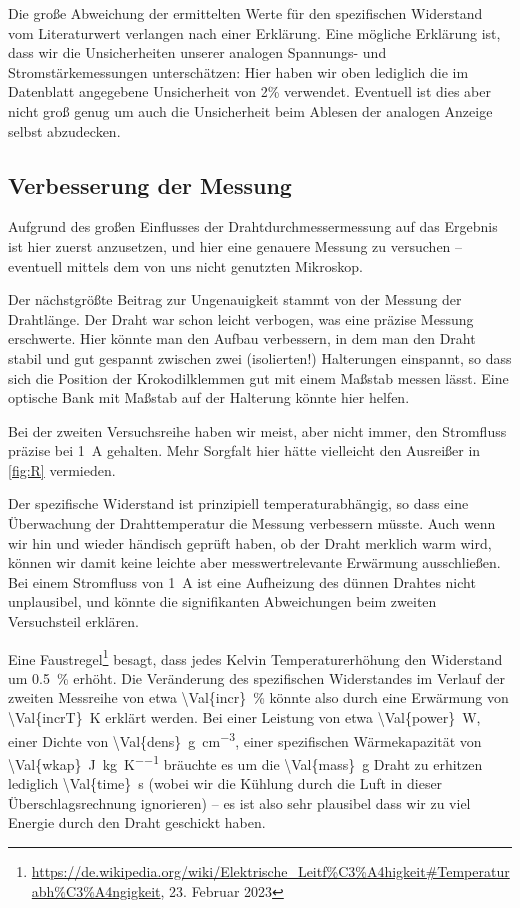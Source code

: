 \documentclass[parskip, 12pt, DIV=16, openany]{scrartcl}
\newcommand{\SIp}[3]{\SI[round-mode=places,round-precision=#1]{\Val{#2}}{#3}}
\begin{document}
Die große Abweichung der ermittelten Werte für den spezifischen Widerstand vom Literaturwert verlangen nach einer Erklärung. Eine mögliche Erklärung ist, dass wir die Unsicherheiten unserer analogen Spannungs- und Stromstärkemessungen unterschätzen: Hier haben wir oben lediglich die im Datenblatt angegebene Unsicherheit von 2\% verwendet. Eventuell ist dies aber nicht groß genug um auch die Unsicherheit beim Ablesen der analogen Anzeige selbst abzudecken.

\subsection{Verbesserung der Messung}

Aufgrund des großen Einflusses der Drahtdurchmessermessung auf das Ergebnis ist hier zuerst anzusetzen, und hier eine genauere Messung zu versuchen – eventuell mittels dem von uns nicht genutzten Mikroskop.

Der nächstgrößte Beitrag zur Ungenauigkeit stammt von der Messung der Drahtlänge. Der Draht war schon leicht verbogen, was eine präzise Messung erschwerte. Hier könnte man den Aufbau verbessern, in dem man den Draht stabil und gut gespannt zwischen zwei (isolierten!) Halterungen einspannt, so dass sich die Position der Krokodilklemmen gut mit einem Maßstab messen lässt. Eine optische Bank mit Maßstab auf der Halterung könnte hier helfen.

Bei der zweiten Versuchsreihe haben wir meist, aber nicht immer, den Stromfluss präzise bei \SI{1}{\A} gehalten. Mehr Sorgfalt hier hätte vielleicht den Ausreißer in \cref{fig:R} vermieden.

Der spezifische Widerstand ist prinzipiell temperaturabhängig, so dass eine Überwachung der Drahttemperatur die Messung verbessern müsste. Auch wenn wir hin und wieder händisch geprüft haben, ob der Draht merklich warm wird, können wir damit keine leichte aber messwertrelevante Erwärmung ausschließen. Bei einem Stromfluss von \SI{1}{\A} ist eine Aufheizung des dünnen Drahtes nicht unplausibel, und könnte die signifikanten Abweichungen beim zweiten Versuchsteil erklären.

Eine Faustregel\footnote{\url{https://de.wikipedia.org/wiki/Elektrische_Leitf\%C3\%A4higkeit\#Temperaturabh\%C3\%A4ngigkeit}, 23. Februar 2023} besagt, dass jedes Kelvin Temperaturerhöhung den Widerstand um \SI{0,5}{\percent} erhöht. Die Veränderung des spezifischen Widerstandes im Verlauf der zweiten Messreihe von etwa \SIp{1}{incr}{\percent} könnte also durch eine Erwärmung von \SIp{0}{incrT}{\kelvin} erklärt werden. Bei einer Leistung von etwa \SIp{2}{power}{\W}, einer Dichte von \SIp{2}{dens}{\g\per\cm\cubed}, einer spezifischen Wärmekapazität von \SIp{0}{wkap}{\J\per\kg\per\K} bräuchte es um die \SIp{2}{mass}{\g} Draht zu erhitzen lediglich \SIp{1}{time}{\s} (wobei wir die Kühlung durch die Luft in dieser Überschlagsrechnung ignorieren) -- es ist also sehr plausibel dass wir zu viel Energie durch den Draht geschickt haben.
\end{document}
